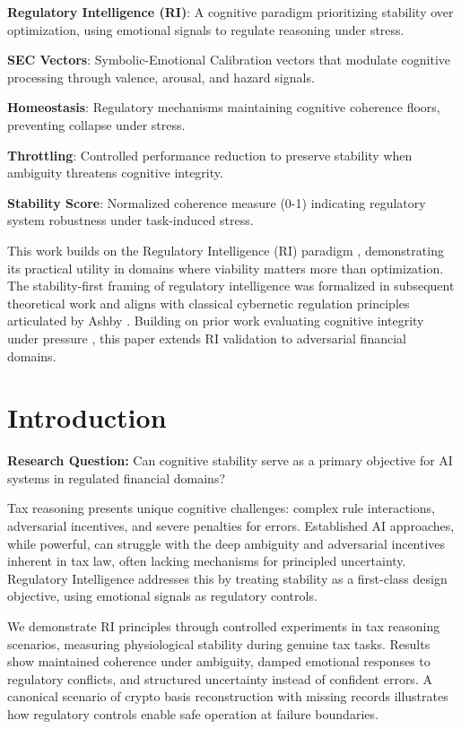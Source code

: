 \documentclass[12pt,a4paper]{article}
\begin{document}
\begin{tcolorbox}[title=Key Concepts, colback=blue!5!white, colframe=blue!75!black]
\textbf{Regulatory Intelligence (RI)}: A cognitive paradigm prioritizing stability over optimization, using emotional signals to regulate reasoning under stress.

\textbf{SEC Vectors}: Symbolic-Emotional Calibration vectors that modulate cognitive processing through valence, arousal, and hazard signals.

\textbf{Homeostasis}: Regulatory mechanisms maintaining cognitive coherence floors, preventing collapse under stress.

\textbf{Throttling}: Controlled performance reduction to preserve stability when ambiguity threatens cognitive integrity.

\textbf{Stability Score}: Normalized coherence measure (0-1) indicating regulatory system robustness under task-induced stress.
\end{tcolorbox}

This work builds on the Regulatory Intelligence (RI) paradigm \cite{Cragin2026RI}, demonstrating its practical utility in domains where viability matters more than optimization. The stability-first framing of regulatory intelligence was formalized in subsequent theoretical work \cite{Cragin2026RI} and aligns with classical cybernetic regulation principles articulated by Ashby \cite{ashby1956introduction}. Building on prior work evaluating cognitive integrity under pressure \cite{Cragin2026Integrity}, this paper extends RI validation to adversarial financial domains.

\section{Introduction}

\textbf{Research Question:} Can cognitive stability serve as a primary objective for AI systems in regulated financial domains?

Tax reasoning presents unique cognitive challenges: complex rule interactions, adversarial incentives, and severe penalties for errors. Established AI approaches, while powerful, can struggle with the deep ambiguity and adversarial incentives inherent in tax law, often lacking mechanisms for principled uncertainty. Regulatory Intelligence addresses this by treating stability as a first-class design objective, using emotional signals as regulatory controls.

We demonstrate RI principles through controlled experiments in tax reasoning scenarios, measuring physiological stability during genuine tax tasks. Results show maintained coherence under ambiguity, damped emotional responses to regulatory conflicts, and structured uncertainty instead of confident errors. A canonical scenario of crypto basis reconstruction with missing records illustrates how regulatory controls enable safe operation at failure boundaries.
\end{document}

